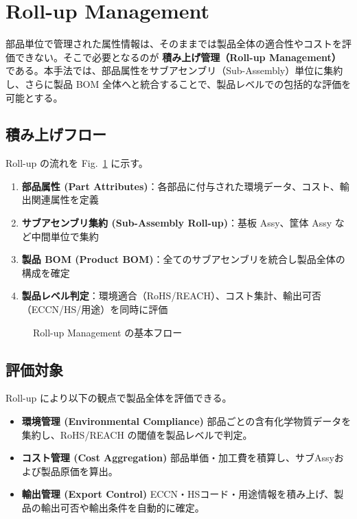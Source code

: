\documentclass[10pt,conference]{IEEEtran}
\begin{document}
\section{Roll-up Management}
部品単位で管理された属性情報は、そのままでは製品全体の適合性やコストを評価できない。そこで必要となるのが \textbf{積み上げ管理（Roll-up Management）} である。本手法では、部品属性をサブアセンブリ（Sub-Assembly）単位に集約し、さらに製品 BOM 全体へと統合することで、製品レベルでの包括的な評価を可能とする。

\subsection{積み上げフロー}
Roll-up の流れを Fig.~\ref{fig:rollup} に示す。
\begin{enumerate}
  \item \textbf{部品属性 (Part Attributes)}：各部品に付与された環境データ、コスト、輸出関連属性を定義
  \item \textbf{サブアセンブリ集約 (Sub-Assembly Roll-up)}：基板 Assy、筐体 Assy など中間単位で集約
  \item \textbf{製品 BOM (Product BOM)}：全てのサブアセンブリを統合し製品全体の構成を確定
  \item \textbf{製品レベル判定}：環境適合（RoHS/REACH）、コスト集計、輸出可否（ECCN/HS/用途）を同時に評価
\end{enumerate}

\begin{figure}[t]
  \centering
  \caption{Roll-up Management の基本フロー}
  \label{fig:rollup}
\end{figure}

\subsection{評価対象}
Roll-up により以下の観点で製品全体を評価できる。
\begin{itemize}
  \item \textbf{環境管理 (Environmental Compliance)}  
  部品ごとの含有化学物質データを集約し、RoHS/REACH の閾値を製品レベルで判定。
  \item \textbf{コスト管理 (Cost Aggregation)}  
  部品単価・加工費を積算し、サブAssyおよび製品原価を算出。
  \item \textbf{輸出管理 (Export Control)}  
  ECCN・HSコード・用途情報を積み上げ、製品の輸出可否や輸出条件を自動的に確定。
\end{itemize}
\end{document}
